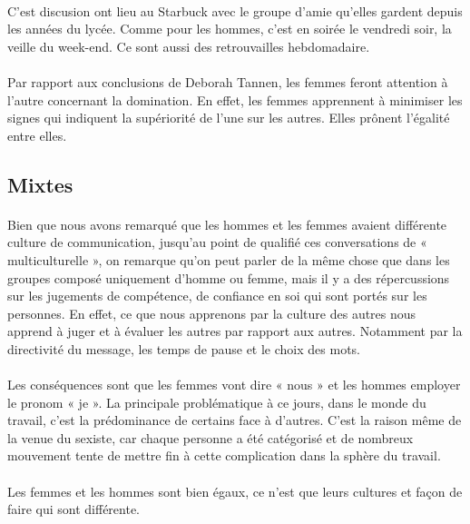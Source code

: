 \paragraph{}
C'est discusion ont lieu au Starbuck avec le groupe d'amie qu'elles gardent depuis les années du lycée.
Comme pour les hommes, c'est en soirée le vendredi soir, la veille du week-end. Ce sont aussi des
retrouvailles hebdomadaire.

\paragraph{}
Par rapport aux conclusions de Deborah Tannen, les femmes feront attention à l'autre concernant la
domination. En effet, les femmes apprennent à minimiser les signes qui indiquent la supériorité de l'une sur
les autres. Elles prônent l'égalité entre elles.

\subsection{Mixtes}
\paragraph{}
Bien que nous avons remarqué que les hommes et les femmes avaient différente culture de communication,
jusqu'au point de qualifié ces conversations de « multiculturelle », on remarque qu'on peut parler de la même
chose que dans les groupes composé uniquement d'homme ou femme, mais il y a des répercussions sur les
jugements de compétence, de confiance en soi qui sont portés sur les personnes. En effet, ce que nous
apprenons par la culture des autres nous apprend à juger et à évaluer les autres par rapport aux autres.
Notamment par la directivité du message, les temps de pause et le choix des mots.

\paragraph{}
Les conséquences sont que les femmes vont dire « nous » et les hommes employer le pronom « je ». La
principale problématique à ce jours, dans le monde du travail, c'est la prédominance de certains face à
d'autres. C'est la raison même de la venue du sexiste, car chaque personne a été catégorisé et de nombreux
mouvement tente de mettre fin à cette complication dans la sphère du travail.

\paragraph{}
Les femmes et les hommes sont bien égaux, ce n'est que leurs cultures et façon de faire qui sont différente.

